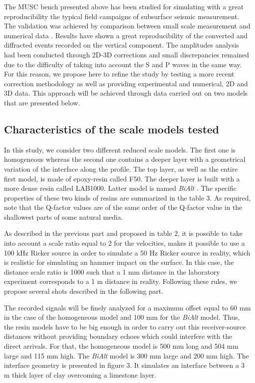 \documentclass[manuscript,revised]{geophysics}
\newcommand{\bialt}{\textit{BiAlt} }
\begin{document}
\noindent The MUSC bench presented above has been studied for simulating with a great reproducibility the typical field campaigns of subsurface seismic measurement. The validation was achieved by comparison between small scale measurement and numerical data \citep{Bretaudeau_SSM_2011}. Results have shown a great reproducibility of the converted and diffracted events recorded on the vertical component. The amplitudes analysis had been conducted through 2D-3D corrections and small discrepancies remained due to the difficulty of taking into account the S and P waves in the same way. For this reason, we propose here to refine the study by testing a more recent correction methodology \citet{Schafer_LSS_2014} as well as providing experimental and numerical, 2D and 3D data. This approach will be achieved through data carried out on two models that are presented below.


\subsection{Characteristics of the scale models tested}

\noindent In this study, we consider two different reduced scale models. The first one is homogeneous whereas the second one contains a deeper layer with a geometrical variation of the interface along the profile. The top layer, as well as the entire first model, is made of epoxy-resin called F50. The deeper layer is built with a more dense resin called LAB1000. Latter model is named \bialt. The specific properties of these two kinds of resins are summarized in the table 3. As required, note that the Q-factor values are of the same order of the Q-factor value in the shallowest parts of some natural media.

\noindent As described in the previous part and proposed in table 2, it is possible to take into account a scale ratio equal to 2 for the velocities, makes it possible to use a 100 kHz Ricker source in order to simulate a 50 Hz Ricker source in reality, which is realistic for simulating an hammer impact on the surface. In this case, the distance scale ratio is 1000 such that a 1 mm distance in the laboratory experiment corresponds to a 1 m distance in reality. Following these rules, we propose several shots described in the following part. 

\noindent The recorded signals will be finely analyzed for a maximum offset equal to 60 mm in the case of the homogeneous model and 100 mm for the \bialt model. Thus, the resin models have to be big enough in order to carry out this receiver-source distances without providing boundary echoes which could interfere with the direct arrivals. For that, the homogeneous model is 500 mm long and 504 mm large and 115 mm high. The \bialt model is 300 mm large and 200 mm high. The interface geometry is presented in figure 3. It simulates an interface between a 3 m thick layer of clay overcoming a limestone layer.
\end{document}
